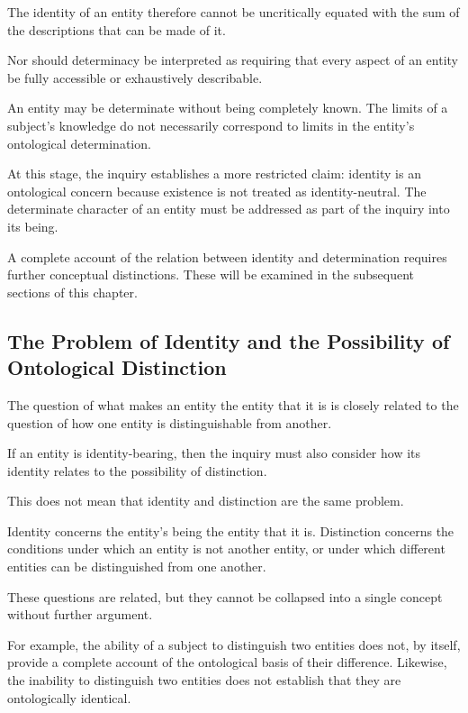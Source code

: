 The identity of an entity therefore cannot be
uncritically equated with the sum of the descriptions
that can be made of it.

Nor should determinacy be interpreted as requiring
that every aspect of an entity be fully accessible
or exhaustively describable.

An entity may be determinate without being completely
known. The limits of a subject's knowledge do not
necessarily correspond to limits in the entity's
ontological determination.

At this stage, the inquiry establishes a more
restricted claim: identity is an ontological concern
because existence is not treated as identity-neutral.
The determinate character of an entity must be
addressed as part of the inquiry into its being.

A complete account of the relation between identity
and determination requires further conceptual
distinctions. These will be examined in the subsequent
sections of this chapter.



\subsection{The Problem of Identity and the Possibility of Ontological Distinction}
\label{subsec:identity-and-ontological-distinction}

The question of what makes an entity the entity that
it is is closely related to the question of how one
entity is distinguishable from another.

If an entity is identity-bearing, then the inquiry
must also consider how its identity relates to the
possibility of distinction.

This does not mean that identity and distinction are
the same problem.

Identity concerns the entity's being the entity that
it is. Distinction concerns the conditions under which
an entity is not another entity, or under which
different entities can be distinguished from one
another.

These questions are related, but they cannot be
collapsed into a single concept without further
argument.

For example, the ability of a subject to distinguish
two entities does not, by itself, provide a complete
account of the ontological basis of their difference.
Likewise, the inability to distinguish two entities
does not establish that they are ontologically
identical.

